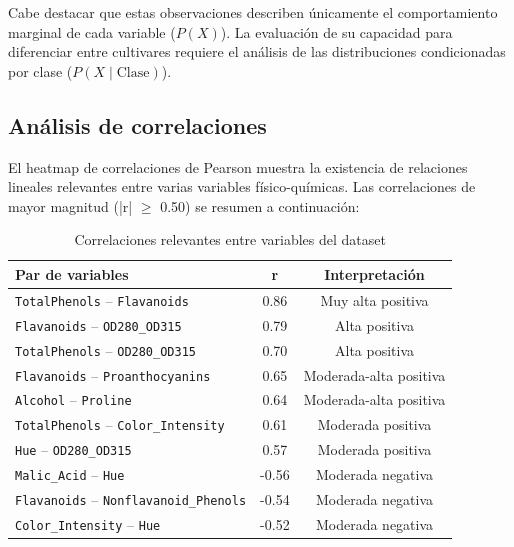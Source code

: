 Cabe destacar que estas observaciones describen únicamente el comportamiento
marginal de cada variable ($P(X)$). La evaluación de su capacidad para diferenciar
entre cultivares requiere el análisis de las distribuciones condicionadas por clase
($P(X \mid \text{Clase})$).


\subsection{Análisis de correlaciones}

El heatmap de correlaciones de Pearson muestra la existencia de relaciones
lineales relevantes entre varias variables físico-químicas. Las correlaciones
de mayor magnitud (|r| $\geq$ 0.50) se resumen a continuación:

\begin{table}[H]
\centering
\caption{Correlaciones relevantes entre variables del dataset}
\begin{tabular}{lcc}
\toprule
\textbf{Par de variables} & \textbf{r} & \textbf{Interpretación} \\
\midrule
\texttt{TotalPhenols} -- \texttt{Flavanoids}        & 0.86 & Muy alta positiva \\
\texttt{Flavanoids} -- \texttt{OD280\_OD315}        & 0.79 & Alta positiva \\
\texttt{TotalPhenols} -- \texttt{OD280\_OD315}      & 0.70 & Alta positiva \\
\texttt{Flavanoids} -- \texttt{Proanthocyanins}     & 0.65 & Moderada-alta positiva \\
\texttt{Alcohol} -- \texttt{Proline}                & 0.64 & Moderada-alta positiva \\
\texttt{TotalPhenols} -- \texttt{Color\_Intensity}  & 0.61 & Moderada positiva \\
\texttt{Hue} -- \texttt{OD280\_OD315}               & 0.57 & Moderada positiva \\
\texttt{Malic\_Acid} -- \texttt{Hue}                & -0.56 & Moderada negativa \\
\texttt{Flavanoids} -- \texttt{Nonflavanoid\_Phenols} & -0.54 & Moderada negativa \\
\texttt{Color\_Intensity} -- \texttt{Hue}           & -0.52 & Moderada negativa \\
\bottomrule
\end{tabular}
\label{tab:correlaciones}
\end{table}

\vspace{0.5cm}

